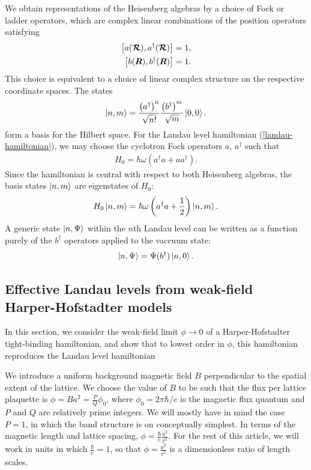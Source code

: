 \documentclass[aps,prb,twocolumn,letterpaper,twoside,nobalancelastpage,groupedaddress,amsmath,amssymb,floatfix,citeautoscript]{revtex4-1}
\begin{document}
We obtain representations of the Heisenberg algebras by a choice of Fock or ladder operators, which are complex linear combinations of the position operators satisfying
\begin{align*}
\comm{a(\boldsymbol{\mathcal{R}})}{a^{\dag}(\boldsymbol{\mathcal{R}})} &= 1, \\
\comm{b(\boldsymbol{R})}{b^{\dag}(\boldsymbol{R})} &= 1.
\end{align*}
This choice is equivalent to a choice of linear complex structure on the respective coordinate spaces. The states 
\begin{align}
\label{basis-state}
\ket{n,m} = \frac{\left(a^{\dag}\right)^n}{\sqrt{n!}}\frac{\left(b^{\dag}\right)^m}{\sqrt{m}} \ket{0,0}.
\end{align}
form a basis for the Hilbert space. For the Landau level hamiltonian (\ref{landau-hamiltonian}), we may choose the cyclotron Fock operators $a$, $a^{\dag}$ such that
\begin{align*}
H_0 = \hbar \omega \left(a^{\dag}a + a a^{\dag}\right).
\end{align*}
Since the hamiltonian is central with respect to both Heisenberg algebras, the basis states $\ket{n,m}$ are eigenstates of $H_0$:
\begin{align*}
H_0 \ket{n,m} = \hbar \omega \left(a^{\dag}a + \frac{1}{2}\right)\ket{n,m}.
\end{align*}
A generic state $\ket{n,\Psi}$ within the $n$th Landau level can be written as a function purely of the $b^{\dag}$ operators applied to the vaccuum state:
\begin{align*}
\ket{n,\Psi} = \Psi(b^{\dag})\ket{n,0}.
\end{align*}

\subsection{Effective Landau levels from weak-field Harper-Hofstadter models}
\label{landau-level-limit}
In this section, we consider the weak-field limit $\phi \rightarrow 0$ of a Harper-Hofstadter tight-binding hamiltonian, and show that to lowest order in $\phi$, this hamiltonian reproduces the Landau level hamiltonian

We introduce a uniform background magnetic field $B$ perpendicular to the spatial extent of the lattice. We choose the value of $B$ to be such that the flux per lattice plaquette is $\phi = Ba^2 = \frac{P}{Q}\phi_0$, where $\phi_0 = 2\pi \hbar /e$ is the magnetic flux quantum and $P$ and $Q$ are relatively prime integers. We will mostly have in mind the case $P =1$, in which the band structure is on conceptually simplest.\cite{Harper:2014vi} In terms of the magnetic length and lattice spacing, $\phi = \frac{\hbar}{e}\frac{a^2}{\ell^2}$. For the rest of this article, we will work in units in which $\frac{\hbar}{e}= 1$, so that $\phi =\frac{a^2}{\ell^2}$ is a dimensionless ratio of length scales.
\end{document}
